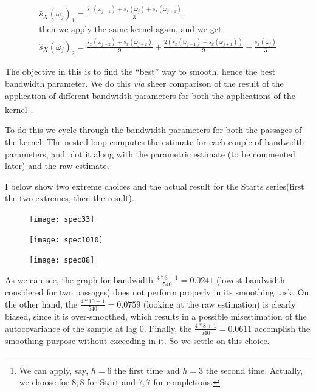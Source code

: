\documentclass[12pt]{article} %
\begin{document}
\begin{equation}
\begin{aligned}
\hat{s}_X(\omega_j)_1=\frac{\hat{s}_x(\omega_{j-1})+\hat{s}_x(\omega_j)+\hat{s}_x(\omega_{j+1})}{3}\\
\text{then we apply the same kernel again, and we get}\\
\hat{s}_X(\omega_j)_2=\frac{\hat{s}_x(\omega_{j-2})+\hat{s}_x(\omega_{j+2})}{9}+\frac{2(\hat{s}_x(\omega_{j-1})+\hat{s}_x(\omega_{j+1}))}{9}+\frac{\hat{s}_x(\omega_j)}{3}
\end{aligned}
\end{equation}

The objective in this is to find the ``best'' way to smooth, hence the best bandwidth parameter. We do this {\em via} sheer comparison of the result of the application of different bandwidth parameters for both the applications of the kernel\footnote{
We can apply, say, $h=6$ the first time and $h=3$ the second time. Actually, we choose for $8,8$ for Start and $7,7$ for completions.}.

To do this we cycle through the bandwidth parameters for both the passages of the kernel. The nested loop computes the estimate for each couple of bandwidth parameters, and plot it along with the parametric estimate (to be commented later) and the raw estimate. 

I below show two extreme choices and the actual result for the Starts series(first the two extremes, then the result).

\begin{figure}[H]
\begin{center}
\texttt{[image: spec33]}
\caption{}
\end{center}
\end{figure}

\begin{figure}[H]
\begin{center}
\texttt{[image: spec1010]}
\caption{}
\end{center}
\end{figure}

\begin{figure}[H]
\begin{center}
\texttt{[image: spec88]}
\caption{}
\end{center}
\end{figure}

As we can see, the graph for bandwidth $\frac{4*3+1}{540}=0.0241$ (lowest bandwidth considered for two passages) does not perform properly in its smoothing task. On the other hand, the $\frac{4*10+1}{540}=0.0759$ (looking at the raw estimation) is clearly biased, since it is over-smoothed, which results in a possible misestimation of the autocovariance of the sample at lag 0. Finally, the $\frac{4*8+1}{540}=0.0611$ accomplish the smoothing purpose without exceeding in it. So we settle on this choice.
\end{document}

